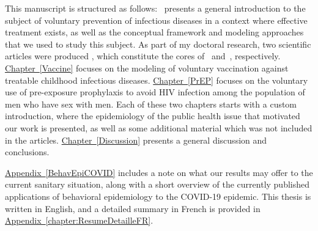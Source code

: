 This manuscript is structured as follows:~ presents a general introduction to the subject of voluntary prevention of infectious diseases in a context where effective treatment exists, as well as the conceptual framework and modeling approaches that we used to study this subject. As part of my doctoral research, two scientific articles were 
produced \cite[]{Jijon2017,Jijon2021}, which constitute the cores of~ and~, respectively. \hyperlink{Vaccine}{Chapter~\ref*{Vaccine}} focuses on the modeling of voluntary vaccination against treatable childhood infectious diseases. \hyperlink{PrEP}{Chapter~\ref*{PrEP}} focuses on the voluntary use of pre-exposure prophylaxis to avoid HIV infection among the population of men who have sex with men. Each of these two chapters starts with a custom introduction, where the epidemiology of the public health issue that motivated our work is presented, as well as some additional material which was not included in the articles. \hyperlink{Discussion}{Chapter~\ref*{Discussion}} presents a general discussion and conclusions. 

\hyperlink{BehavEpiCOVID}{Appendix~\ref*{BehavEpiCOVID}} includes a note on what our results may offer to the current sanitary situation, along with a short overview of the currently published applications of behavioral epidemiology to the COVID-19 epidemic. This thesis is written in English, and a detailed summary in French is provided in \hyperlink{chapter:ResumeDetailleFR}{Appendix~\ref*{chapter:ResumeDetailleFR}}.